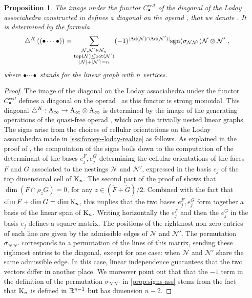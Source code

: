 \documentclass[twoside, 11pt]{amsart}
\newtheorem{proposition}[definition]{Proposition}
\theoremstyle{remark}
\begin{document}
\begin{proposition}
\label{prop:diagonal-polytopale-a-infini}
The image under the functor $C_\bullet^{cell}$ of the diagonal of the Loday associahedra constructed in \cite{MTTV19} defines a diagonal on the operad \Ainf , that we denote \diagainf . It is determined by the formula 
\[ \triangle^{K} \left( (\bullet \cdots \bullet) \right) = 
\sum_{\substack{
  \mathcal{N},\mathcal{N}' \in \mathcal{N}_n \\ 
  \operatorname{top}(\mathcal{N}) \leq \operatorname{bot}(\mathcal{N'}) \\
  |\mathcal{N}|+|\mathcal{N}'|=n
}}
(-1)^{|\mathrm{Ad}(\mathcal{N})\cap \mathrm{Ad}(\mathcal{N}')|}\mathrm{sgn}(\sigma_{\mathcal{N}\mathcal{N}'})\mathcal{N} \otimes \mathcal{N}' \ , \] 
where $\bullet \cdots \bullet$ stands for the linear graph with $n$ vertices. 
\end{proposition}

\begin{proof}
The image of the diagonal on the Loday associahedra under the functor $C_\bullet^{cell}$ defines a diagonal on the operad \Ainf\ as this functor is strong monoidal. 
This diagonal $\triangle^{K} : \mathrm{A}_\infty \rightarrow \mathrm{A}_\infty \otimes \mathrm{A}_\infty$ is determined by the image of the generating operations of the quasi-free operad \Ainf , which are the trivially nested linear graphs. 
The signs arise from the choices of cellular orientations on the Loday associahedra made in \cref{sss:forcey--loday-realize} as follows. 
As explained in the proof of \cite[Proposition 4.27]{LA21}, the computation of the signs boils down to the computation of the determinant of the bases $e_j^{F}, e_j^{G}$ determining the cellular orientations of the faces $F$ and $G$ associated to the nestings $\mathcal{N}$ and $\mathcal{N}'$, expressed in the basis $e_j$ of the top dimensional cell of $\mathrm{K}_n$. 
The second part of the proof of \cite[Theorem 1.26]{LA21} shows that  $\dim(F\cap \rho_z G)=0$, for any $z \in (\mathring F+ \mathring G)/2$.
Combined with the fact that $\dim F + \dim G = \dim \mathrm{K}_n$, this implies that the two bases $e_j^F, e_j^G$ form together a basis of the linear span of $\mathrm{K}_n$. 
Writing horizontally the $e_j^F$ and then the $e_j^G$ in the basis $e_j$ defines a square matrix.
The positions of the rightmost non-zero entries of each line are given by the admissible edges of $\mathcal{N}$ and $\mathcal{N}'$. 
The permutation $\sigma_{\mathcal{N}\mathcal{N}'}$ corresponds to a permutation of the lines of this matrix, sending these righmost entries to the diagonal, except for one case: when $\mathcal{N}$ and $\mathcal{N}'$ share the same admissible edge. 
In this case, linear independence guarantees that the two vectors differ in another place.
We moreover point out that that the $-1$ term in the definition of the permutation $\sigma_{\mathcal{N}\mathcal{N}'}$ in \cref{prop:signs-ass} stems from the fact that $\mathrm{K}_n$ is defined in $\mathbb{R}^{n-1}$ but has dimension $n-2$. 
\end{proof}
\end{document}
